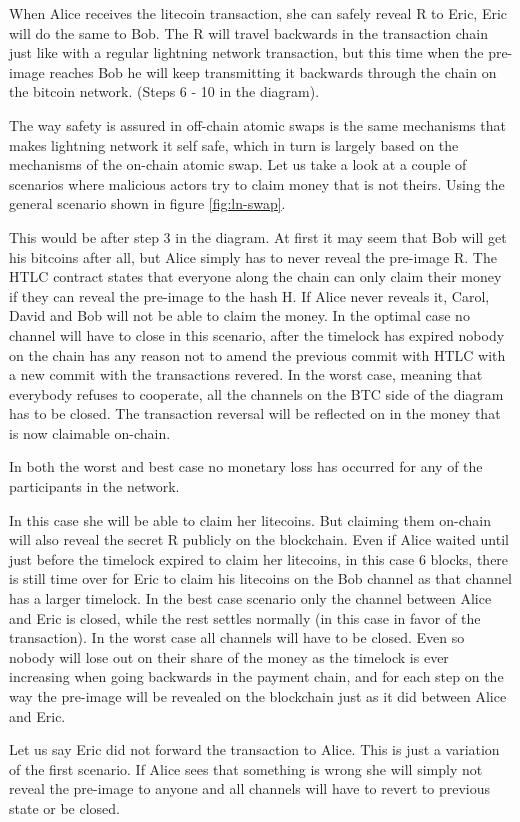 When Alice receives the litecoin transaction, she can safely reveal R to Eric, Eric will do the same to Bob. The R will travel backwards in the transaction chain just like with a regular lightning network transaction, but this time when the pre-image reaches Bob he will keep transmitting it backwards through the chain on the bitcoin network. (Steps 6 - 10 in the diagram).

The way safety is assured in off-chain atomic swaps is the same mechanisms that makes lightning network it self safe, which in turn is largely based on the mechanisms of the on-chain atomic swap. 
Let us take a look at a couple of scenarios where malicious actors try to claim money that is not theirs. Using the general scenario shown in figure \ref{fig:ln-swap}.

This would be after step 3 in the diagram. At first it may seem that Bob will get his bitcoins after all, but Alice simply has to never reveal the pre-image R. The HTLC contract states that everyone along the chain can only claim their money if they can reveal the pre-image to the hash H. If Alice never reveals it, Carol, David and Bob will not be able to claim the money. In the optimal case no channel will have to close in this scenario, after the timelock has expired nobody on the chain has any reason not to amend the previous commit with HTLC with a new commit with the transactions revered. In the worst case, meaning that everybody refuses to cooperate, all the channels on the BTC side of the diagram has to be closed. The transaction reversal will be reflected on in the money that is now claimable on-chain.

In both the worst and best case no monetary loss has occurred for any of the participants in the network.

In this case she will be able to claim her litecoins. But claiming them on-chain will also reveal the secret R publicly on the blockchain. Even if Alice waited until just before the timelock expired to claim her litecoins, in this case 6 blocks, there is still time over for Eric to claim his litecoins on the Bob channel as that channel has a larger timelock. In the best case scenario only the channel between Alice and Eric is closed, while the rest settles normally (in this case in favor of the transaction). In the worst case all channels will have to be closed. Even so nobody will lose out on their share of the money as the timelock is ever increasing when going backwards in the payment chain, and for each step on the way the pre-image will be revealed on the blockchain just as it did between Alice and Eric. 

Let us say Eric did not forward the transaction to Alice. This is just a variation of the first scenario. If Alice sees that something is wrong she will simply not reveal the pre-image to anyone and all channels will have to revert to previous state or be closed.
